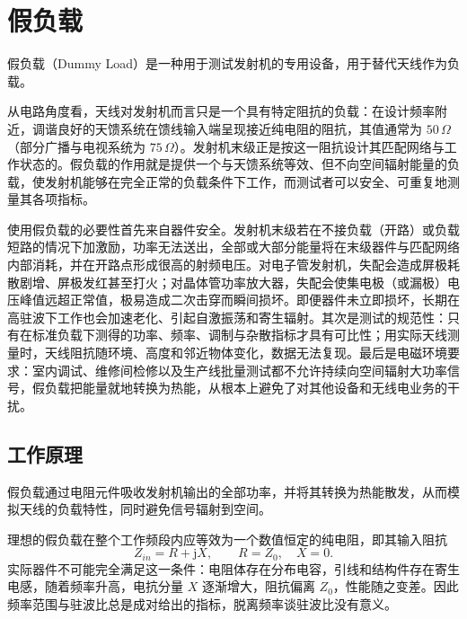 
\chapter{假负载}
\label{chap:dummy_load}

假负载（Dummy Load）是一种用于测试发射机的专用设备，用于替代天线作为负载。

从电路角度看，天线对发射机而言只是一个具有特定阻抗的负载：在设计频率附近，调谐良好的天馈系统在馈线输入端呈现接近纯电阻的阻抗，其值通常为 $50\,\Omega$（部分广播与电视系统为 $75\,\Omega$）。发射机末级正是按这一阻抗设计其匹配网络与工作状态的。假负载的作用就是提供一个与天馈系统等效、但不向空间辐射能量的负载，使发射机能够在完全正常的负载条件下工作，而测试者可以安全、可重复地测量其各项指标。

使用假负载的必要性首先来自器件安全。发射机末级若在不接负载（开路）或负载短路的情况下加激励，功率无法送出，全部或大部分能量将在末级器件与匹配网络内部消耗，并在开路点形成很高的射频电压。对电子管发射机，失配会造成屏极耗散剧增、屏极发红甚至打火；对晶体管功率放大器，失配会使集电极（或漏极）电压峰值远超正常值，极易造成二次击穿而瞬间损坏。即便器件未立即损坏，长期在高驻波下工作也会加速老化、引起自激振荡和寄生辐射。其次是测试的规范性：只有在标准负载下测得的功率、频率、调制与杂散指标才具有可比性；用实际天线测量时，天线阻抗随环境、高度和邻近物体变化，数据无法复现。最后是电磁环境要求：室内调试、维修间检修以及生产线批量测试都不允许持续向空间辐射大功率信号，假负载把能量就地转换为热能，从根本上避免了对其他设备和无线电业务的干扰。

\section{工作原理}
\label{sec:dummy_load_principle}

假负载通过电阻元件吸收发射机输出的全部功率，并将其转换为热能散发，从而模拟天线的负载特性，同时避免信号辐射到空间。

理想的假负载在整个工作频段内应等效为一个数值恒定的纯电阻，即其输入阻抗
\[
Z_{in} = R + \mathrm{j}X, \qquad R = Z_0,\quad X = 0 .
\]
实际器件不可能完全满足这一条件：电阻体存在分布电容，引线和结构件存在寄生电感，随着频率升高，电抗分量 $X$ 逐渐增大，阻抗偏离 $Z_0$，性能随之变差。因此频率范围与驻波比总是成对给出的指标，脱离频率谈驻波比没有意义。


